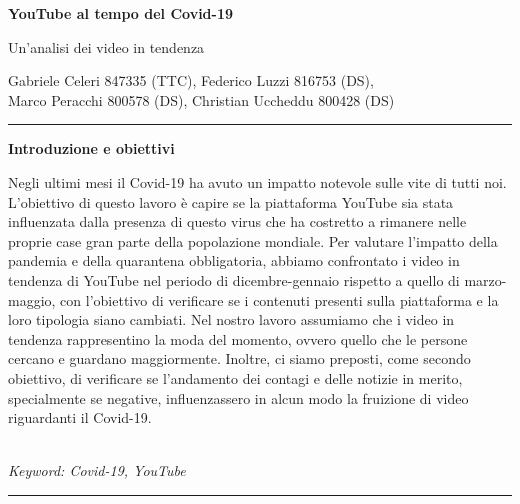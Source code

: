 \documentclass[10pt, a4paper,openany]{article}
\begin{document}
\begin{center}
\huge\textbf{YouTube al tempo del Covid-19}

Un'analisi dei video in tendenza
\end{center}

\begin{center}
Gabriele Celeri 847335 (TTC), Federico Luzzi 816753 (DS),\\  Marco Peracchi 800578 (DS), Christian Uccheddu 800428 (DS)
\end{center}

\hrule
\vspace{0.2cm}
\begin{center}\textbf{Introduzione e obiettivi}\end{center} 
Negli ultimi mesi il Covid-19 ha avuto un impatto notevole sulle vite di tutti noi. L'obiettivo di questo lavoro è capire se la piattaforma YouTube sia stata influenzata dalla presenza di questo virus che ha costretto a rimanere nelle proprie case gran parte della popolazione mondiale. 
Per valutare l'impatto della pandemia e della quarantena obbligatoria, abbiamo confrontato i video in tendenza di YouTube nel periodo di dicembre-gennaio rispetto a quello di marzo-maggio, con l'obiettivo di verificare se i contenuti presenti sulla piattaforma e la loro tipologia siano cambiati. Nel nostro lavoro assumiamo che i video in tendenza rappresentino la moda del momento, ovvero quello che le persone cercano e guardano maggiormente.
Inoltre, ci siamo preposti, come secondo obiettivo, di verificare se l'andamento dei contagi e delle notizie in merito, specialmente se negative, influenzassero in alcun modo la fruizione di video riguardanti il Covid-19.
\\\\ \begin{small}
	\textit{Keyword: Covid-19, YouTube}
\end{small}
\vspace{0.2cm}
\hrule



  
\end{document}
